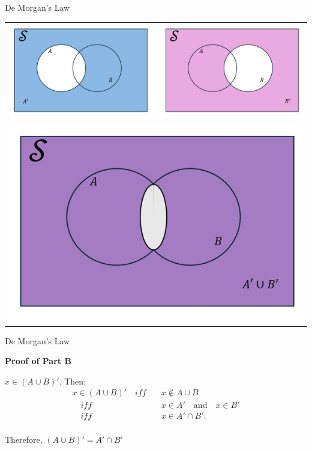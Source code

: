 \documentclass[aspectratio=169,xcolor=pdftex,dvipsnames,table]{beamer}\usepackage[]{graphicx}\usepackage[]{xcolor}
\begin{document}
\begin{frame}{De Morgan's Law}

\begin{center}
\begin{tabular}{cc}
\includegraphics[width = .375\textwidth]{Figures/de_morgans_1_2/Slide2.JPG} &
\includegraphics[width = .375\textwidth]{Figures/de_morgans_1_2/Slide3.JPG} \\
\multicolumn{2}{c}{\includegraphics[width = .375\textwidth]{Figures/de_morgans_1_2/Slide4.JPG}}
\end{tabular}
\end{center}
\end{frame}

\begin{frame}{De Morgan's Law}

\textbf{Proof of Part B}

\bigskip

$x \in (A\cup B)'$. Then:
\begin{align*}
x \in (A\cup B)'
\quad iff & \quad x \notin A \cup B\\
\quad iff & \quad x \in A' \quad \mathrm{ and } \quad x \in B'\\
\quad iff & \quad x \in A' \cap B'.\\
\end{align*}

Therefore, $(A\cup B)'=A' \cap B'$
\end{frame}
\end{document}
